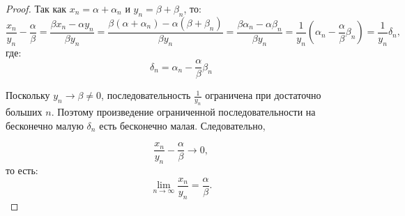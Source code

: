 \begin{proof} Так как \(x_n=\alpha+\alpha_n\) и \(y_n=\beta+\beta_n\), то:
\[
\frac{x_n}{y_n}-\frac{\alpha}{\beta}
=
\frac{\beta x_n-\alpha y_n}{\beta y_n}
=
\frac{\beta(\alpha+\alpha_n)-\alpha(\beta+\beta_n)}{\beta y_n}
=
\frac{\beta\alpha_n-\alpha\beta_n}{\beta y_n}
=
\frac{1}{y_n}\left(\alpha_n-\frac{\alpha}{\beta}\beta_n\right)
=
\frac{1}{y_n}\delta_n,
\]
где:
\[
\delta_n=\alpha_n-\frac{\alpha}{\beta}\beta_n
\]

Поскольку \(y_n\to\beta\ne 0\), последовательность \(\frac{1}{y_n}\)
ограничена при достаточно больших \(n\). Поэтому произведение ограниченной
последовательности на бесконечно малую \(\delta_n\) есть бесконечно малая.
Следовательно,

\[
\frac{x_n}{y_n}-\frac{\alpha}{\beta}\to 0,
\]
то есть:
\[
\lim_{n\to\infty}\frac{x_n}{y_n}=\frac{\alpha}{\beta}.
\]
\end{proof}



